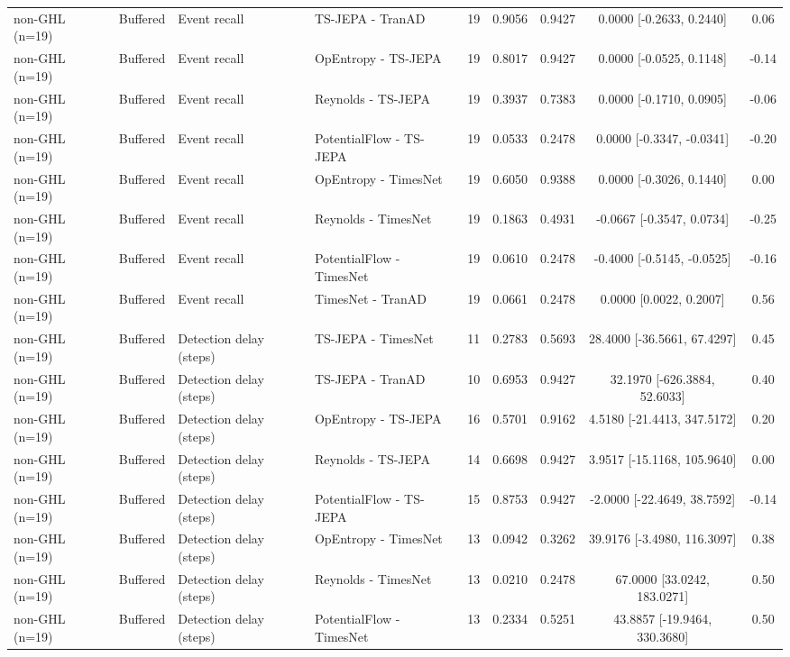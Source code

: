 \begin{table}[t]
\begin{tabular}{@{}llllccccc@{}}
non-GHL (n=19) & Buffered & Event recall & TS-JEPA - TranAD & 19 & 0.9056 & 0.9427 & 0.0000 [-0.2633, 0.2440] & 0.06 \\
non-GHL (n=19) & Buffered & Event recall & OpEntropy - TS-JEPA & 19 & 0.8017 & 0.9427 & 0.0000 [-0.0525, 0.1148] & -0.14 \\
non-GHL (n=19) & Buffered & Event recall & Reynolds - TS-JEPA & 19 & 0.3937 & 0.7383 & 0.0000 [-0.1710, 0.0905] & -0.06 \\
non-GHL (n=19) & Buffered & Event recall & PotentialFlow - TS-JEPA & 19 & 0.0533 & 0.2478 & 0.0000 [-0.3347, -0.0341] & -0.20 \\
non-GHL (n=19) & Buffered & Event recall & OpEntropy - TimesNet & 19 & 0.6050 & 0.9388 & 0.0000 [-0.3026, 0.1440] & 0.00 \\
non-GHL (n=19) & Buffered & Event recall & Reynolds - TimesNet & 19 & 0.1863 & 0.4931 & -0.0667 [-0.3547, 0.0734] & -0.25 \\
non-GHL (n=19) & Buffered & Event recall & PotentialFlow - TimesNet & 19 & 0.0610 & 0.2478 & -0.4000 [-0.5145, -0.0525] & -0.16 \\
non-GHL (n=19) & Buffered & Event recall & TimesNet - TranAD & 19 & 0.0661 & 0.2478 & 0.0000 [0.0022, 0.2007] & 0.56 \\
non-GHL (n=19) & Buffered & Detection delay (steps) & TS-JEPA - TimesNet & 11 & 0.2783 & 0.5693 & 28.4000 [-36.5661, 67.4297] & 0.45 \\
non-GHL (n=19) & Buffered & Detection delay (steps) & TS-JEPA - TranAD & 10 & 0.6953 & 0.9427 & 32.1970 [-626.3884, 52.6033] & 0.40 \\
non-GHL (n=19) & Buffered & Detection delay (steps) & OpEntropy - TS-JEPA & 16 & 0.5701 & 0.9162 & 4.5180 [-21.4413, 347.5172] & 0.20 \\
non-GHL (n=19) & Buffered & Detection delay (steps) & Reynolds - TS-JEPA & 14 & 0.6698 & 0.9427 & 3.9517 [-15.1168, 105.9640] & 0.00 \\
non-GHL (n=19) & Buffered & Detection delay (steps) & PotentialFlow - TS-JEPA & 15 & 0.8753 & 0.9427 & -2.0000 [-22.4649, 38.7592] & -0.14 \\
non-GHL (n=19) & Buffered & Detection delay (steps) & OpEntropy - TimesNet & 13 & 0.0942 & 0.3262 & 39.9176 [-3.4980, 116.3097] & 0.38 \\
non-GHL (n=19) & Buffered & Detection delay (steps) & Reynolds - TimesNet & 13 & 0.0210 & 0.2478 & 67.0000 [33.0242, 183.0271] & 0.50 \\
non-GHL (n=19) & Buffered & Detection delay (steps) & PotentialFlow - TimesNet & 13 & 0.2334 & 0.5251 & 43.8857 [-19.9464, 330.3680] & 0.50 \\

\end{tabular}
\end{table}
